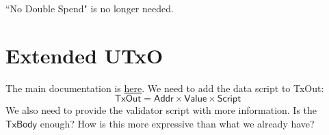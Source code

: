 \documentclass[11pt,a4paper]{article}
\newcommand{\type}[1]{\mathsf{#1}}
\newcommand{\Script}{\type{Script}}
\newcommand{\Addr}{\type{Addr}}
\newcommand{\Value}{\type{Value}}
\newcommand{\TxOut}{\type{TxOut}}
\newcommand{\TxBody}{\type{TxBody}}
\begin{document}
``No Double Spend" is no longer needed.

\section{Extended UTxO}

The main documentation is \href{https://github.com/input-output-hk/plutus/tree/master/docs/extended-utxo}{here}.
We need to add the data script to TxOut:
$$ \TxOut = \Addr \times \Value \times \Script $$
We also need to provide the validator script with more information.  Is the $\TxBody$ enough?
How is this more expressive than what we already have?



\end{document}

